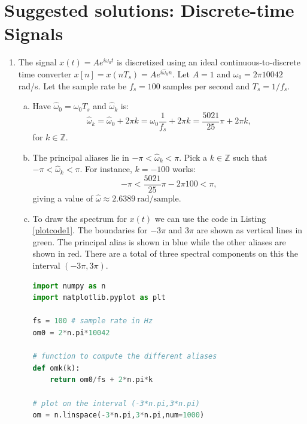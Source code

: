 \newpage
\section{Suggested solutions: Discrete-time Signals}
\begin{enumerate}
\item The signal $x(t)=Ae^{i\omega_{0}t}$ is discretized using an ideal continuous-to-discrete time converter $x[n]=x(nT_{s})=Ae^{i\hat{\omega}_{k}n}$. 
Let $A=1$ and $\omega_{0}=2\pi 10042$ rad/s. Let the sample rate be $f_{s}=100$ samples per second and $T_{s}=1/f_{s}$.

\begin{enumerate}[a)]
\item Have $\hat{\omega}_{0}=\omega_{0}T_{s}$ and $\hat{\omega}_{k}$ is:
$$\hat{\omega}_{k}=\hat{\omega}_{0}+2\pi k=\omega_{0}\frac{1}{f_{s}}+2\pi k=\frac{5021}{25}\pi+2\pi k,$$
for $k\in\mathbb{Z}$. 

\item The principal aliases lie in $-\pi<\hat{\omega}_{k}<\pi$. Pick a $k\in\mathbb{Z}$ such that $-\pi<\hat{\omega}_{k}<\pi$. 
For instance, $k=-100$ works:
$$-\pi < \frac{5021}{25}\pi-2\pi 100 < \pi,$$
giving a value of $\hat{\omega}\approx2.6389\ \text{rad/sample}$. 

\item To draw the spectrum for $x(t)$ we can use the code in Listing \ref{plotcode1}. The boundaries for $-3\pi$ and $3\pi$ are shown
as vertical lines in green. The principal alias is shown in blue while the other aliases are shown in red. There are a total of 
three spectral components on this the interval $(-3\pi,3\pi)$. 

\begin{lstlisting}[language=Python, caption=Spectrum of $x(t)$,label=plotcode1]
import numpy as n
import matplotlib.pyplot as plt

fs = 100 # sample rate in Hz
om0 = 2*n.pi*10042

# function to compute the different aliases
def omk(k):
	return om0/fs + 2*n.pi*k

# plot on the interval (-3*n.pi,3*n.pi)
om = n.linspace(-3*n.pi,3*n.pi,num=1000)


\end{lstlisting}
\end{enumerate}
\end{enumerate}
